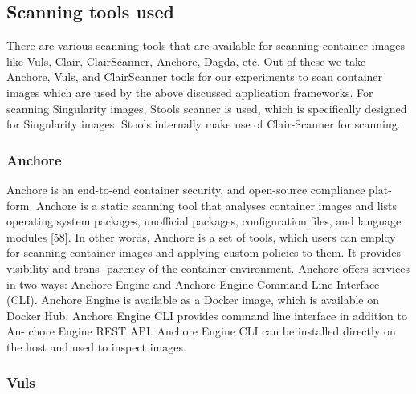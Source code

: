 \documentclass[a4paper,num-refs]{oup-contemporary}
\begin{document}
\subsection{Scanning tools used}

There are various scanning tools that are available for scanning container
images like Vuls, Clair, ClairScanner, Anchore, Dagda, etc.
Out of these we take Anchore, Vuls, and ClairScanner tools for our experiments to scan container
images which are used by the above discussed application frameworks.
For scanning Singularity images, Stools scanner is used, which is specifically designed
for Singularity images. Stools internally make use of Clair-Scanner for
scanning.

\subsubsection{Anchore}

Anchore is an end-to-end container security, and open-source compliance plat-
form. Anchore is a static scanning tool that analyses container images and
lists operating system packages,
unofficial packages, configuration files, and language modules [58]. In other
words, Anchore is a set of tools, which users can employ for scanning container
images and applying custom policies to them. It provides visibility and trans-
parency of the container environment. Anchore offers services in two ways:
Anchore Engine and Anchore Engine Command Line Interface (CLI).
Anchore Engine is available as a Docker image, which is available on Docker
Hub. Anchore Engine CLI provides command line interface in addition to An-
chore Engine REST API. Anchore Engine CLI can be installed directly on the
host and used to inspect images.

\subsubsection{Vuls}
\end{document}
